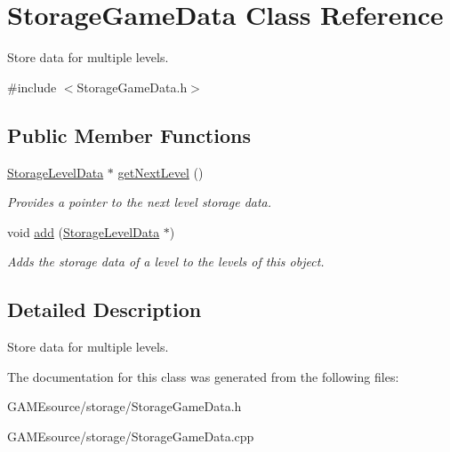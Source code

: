 \hypertarget{class_storage_game_data}{}\section{Storage\+Game\+Data Class Reference}
\label{class_storage_game_data}


Store data for multiple levels.  




{\ttfamily \#include $<$Storage\+Game\+Data.\+h$>$}

\subsection*{Public Member Functions}
\begin{DoxyCompactItemize}
\item 
\mbox{\label{class_storage_game_data_ad1fd5ccb17b058a962da24ad540f1c07}} 
\mbox{\hyperlink{class_storage_level_data}{Storage\+Level\+Data}} $\ast$ \mbox{\hyperlink{class_storage_game_data_ad1fd5ccb17b058a962da24ad540f1c07}{get\+Next\+Level}} ()
\begin{DoxyCompactList}\small\item\em Provides a pointer to the next level storage data. \end{DoxyCompactList}\item 
\mbox{\label{class_storage_game_data_a70a32ba6ae47656e3c66a33cf7ab41d4}} 
void \mbox{\hyperlink{class_storage_game_data_a70a32ba6ae47656e3c66a33cf7ab41d4}{add}} (\mbox{\hyperlink{class_storage_level_data}{Storage\+Level\+Data}} $\ast$)
\begin{DoxyCompactList}\small\item\em Adds the storage data of a level to the levels of this object. \end{DoxyCompactList}\end{DoxyCompactItemize}


\subsection{Detailed Description}
Store data for multiple levels. 

The documentation for this class was generated from the following files\+:\begin{DoxyCompactItemize}
\item 
G\+A\+M\+Esource/storage/Storage\+Game\+Data.\+h\item 
G\+A\+M\+Esource/storage/Storage\+Game\+Data.\+cpp\end{DoxyCompactItemize}
